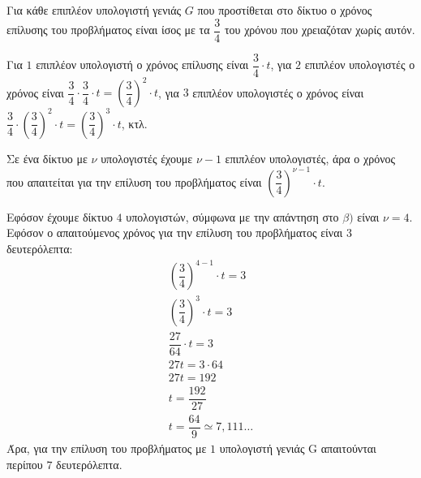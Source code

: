 \begin{alist}
\item Για κάθε επιπλέον υπολογιστή γενιάς $G$ που προστίθεται στο δίκτυο ο χρόνος επίλυσης
του προβλήματος είναι ίσος με τα $\dfrac{3}{4}$ του χρόνου που χρειαζόταν χωρίς αυτόν.

Για $1$ επιπλέον υπολογιστή ο χρόνος επίλυσης είναι $\dfrac{3}{4} \cdot t$, για $2$ επιπλέον υπολογιστές ο
χρόνος είναι $\dfrac{3}{4} \cdot \dfrac{3}{4} \cdot t = \left(\dfrac{3}{4}\right)^2 \cdot t$, για $3$ επιπλέον υπολογιστές ο χρόνος είναι $\dfrac{3}{4} \cdot \left(\dfrac{3}{4}\right)^2 \cdot t =
\left(\dfrac{3}{4}\right)^3 \cdot t$, κτλ.

Σε ένα δίκτυο με $\nu$ υπολογιστές έχουμε $\nu - 1$ επιπλέον υπολογιστές, άρα ο χρόνος που
απαιτείται για την επίλυση του προβλήματος είναι $\left(\dfrac{3}{4}\right)^{\nu-1} \cdot t$.

\item Εφόσον έχουμε δίκτυο $4$ υπολογιστών, σύμφωνα με την απάντηση στο $\beta)$ είναι $\nu = 4$.
Εφόσον ο απαιτούμενος χρόνος για την επίλυση του προβλήματος είναι $3$ δευτερόλεπτα:
\begin{gather*}
\left(\dfrac{3}{4}\right)^{4-1} \cdot t = 3 \\
\left(\dfrac{3}{4}\right)^3 \cdot t = 3 \\
\dfrac{27}{64} \cdot t = 3 \\
27t = 3 \cdot 64 \\
27t = 192 \\
t = \dfrac{192}{27} \\
t = \dfrac{64}{9} \simeq 7,111\dots
\end{gather*}
Άρα, για την επίλυση του προβλήματος με $1$ υπολογιστή γενιάς G απαιτούνται περίπου $7$
δευτερόλεπτα.
\end{alist}

